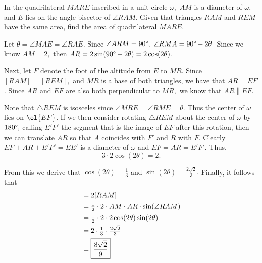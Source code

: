 \documentclass[letterpaper,oneside]{scrartcl}
\begin{document}
\begin{problem*}
  In the quadrilateral $MARE$ inscribed in a unit circle $\omega,$ $AM$ is a diameter of $\omega,$ and $E$ lies on the angle bisector of $\angle RAM.$ Given that triangles $RAM$ and $REM$ have the same area, find the area of quadrilateral $MARE.$
\end{problem*}
\begin{soln}
  Let \(\theta = \angle MAE = \angle RAE\). Since \(\angle ARM = 90\degree,\) \(\angle RMA = 90\degree - 2\theta.\) Since we know \(AM = 2,\) then \(AR = 2\sin(90\degree - 2\theta) = 2\cos(2\theta).\)

  Next, let \(F\) denote the foot of the altitude from \(E\) to \(MR\). Since \([RAM] = [REM],\) and \(MR\) is a base of both triangles, we have that \(AR = EF\). Since \(AR\) and \(EF\) are also both perpendicular to \(MR,\) we know that \(AR \parallel EF.\)

  Note that \(\triangle REM\) is isosceles since \(\angle MRE = \angle RME = \theta\). Thus the center of \(\omega\) lies on \(\ol{EF}\). If we then consider rotating \(\triangle REM\) about the center of \(\omega\) by \(180\degree,\) calling \(E'F'\) the segment that is the image of \(EF\) after this rotation, then we can translate \(AR\) so that \(A\) coincides with \(F'\) and \(R\) with \(F\). Clearly \(EF + AR +E'F' = EE'\) is a diameter of \(\omega\) and \(EF = AR = E'F'\). Thus,
  \[3\cdot2\cos(2\theta) = 2.\]

  From this we derive that \(\cos(2\theta) = \frac13\) and \(\sin(2\theta) = \frac{2\sqrt2}{3}.\) Finally, it follows that
  \begin{align*}
    [MARE] & = 2[RAM]                                                 \\
           & = \tfrac12 \cdot 2\cdot AM\cdot AR\cdot \sin(\angle RAM) \\
           & = \tfrac12\cdot2\cdot2\cos(2\theta)\sin(2\theta)         \\
           & = 2\cdot\tfrac13\cdot\tfrac{2\sqrt2}{3}                  \\
           & = \fbox{$\displaystyle \frac{8\sqrt2}{9}$}
  \end{align*}
\end{soln}
\end{document}
